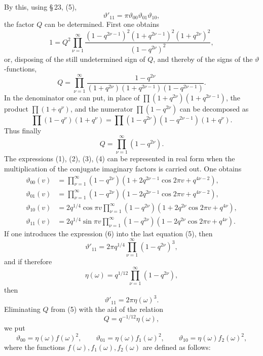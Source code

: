 \documentclass[11pt]{article}
\providecommand{\tht}{\vartheta}
\begin{document}
By this, using \S\,23, (5),
\[
\tht'_{11}=\pi\tht_{00}\tht_{01}\tht_{10},
\]
the factor $Q$ can be determined. First one obtains
\[
1=Q^2\prod_{\nu=1}^{\infty}\frac{(1-q^{2\nu-1})^2(1+q^{2\nu-1})^2(1+q^{2\nu})^2}{(1-q^{2\nu})^2},
\]
or, disposing of the still undetermined sign of $Q$, and thereby of the signs of the $\vartheta$-functions,
\[
Q=\prod_{\nu=1}^{\infty}\frac{1-q^{2\nu}}{(1+q^{2\nu})(1+q^{2\nu-1})(1-q^{2\nu-1})}.
\]
In the denominator one can put, in place of $\prod(1+q^{2\nu})(1+q^{2\nu-1})$, the product $\prod(1+q^{\nu})$, and the numerator $\prod(1-q^{2\nu})$ can be decomposed as
\[
\prod(1-q^{\nu})(1+q^{\nu})=\prod(1-q^{2\nu})(1-q^{2\nu-1})(1+q^{\nu}).
\]
Thus finally
\begin{equation}
Q=\prod_{\nu=1}^{\infty}(1-q^{2\nu}).
\tag{6}
\end{equation}
The expressions (1), (2), (3), (4) can be represented in real form when the multiplication of the conjugate imaginary factors is carried out. One obtains
\begin{equation}
\begin{aligned}
\tht_{00}(v)&=\prod_{\nu=1}^{\infty}(1-q^{2\nu})(1+2q^{2\nu-1}\cos2\pi v+q^{4\nu-2}),\\
\tht_{01}(v)&=\prod_{\nu=1}^{\infty}(1-q^{2\nu})(1-2q^{2\nu-1}\cos2\pi v+q^{4\nu-2}),\\
\tht_{10}(v)&=2q^{1/4}\cos\pi v\prod_{\nu=1}^{\infty}(1-q^{2\nu})(1+2q^{2\nu}\cos2\pi v+q^{4\nu}),\\
\tht_{11}(v)&=2q^{1/4}\sin\pi v\prod_{\nu=1}^{\infty}(1-q^{2\nu})(1-2q^{2\nu}\cos2\pi v+q^{4\nu}).
\end{aligned}
\tag{7}
\end{equation}
If one introduces the expression (6) into the last equation (5), then
\[
\tht'_{11}=2\pi q^{1/4}\prod_{\nu=1}^{\infty}(1-q^{2\nu})^3,
\]
and if therefore
\begin{equation}
\eta(\omega)=q^{1/12}\prod_{\nu=1}^{\infty}(1-q^{2\nu}),
\tag{8}
\end{equation}
then
\begin{equation}
\tht'_{11}=2\pi\eta(\omega)^3.
\tag{9}
\end{equation}
Eliminating $Q$ from (5) with the aid of the relation
\[
Q=q^{-1/12}\eta(\omega),
\]
we put
\begin{equation}
\tht_{00}=\eta(\omega)f(\omega)^2,
\qquad
\tht_{01}=\eta(\omega)f_1(\omega)^2,
\qquad
\tht_{10}=\eta(\omega)f_2(\omega)^2,
\tag{10}
\end{equation}
where the functions $f(\omega),f_1(\omega),f_2(\omega)$ are defined as follows:
\end{document}

